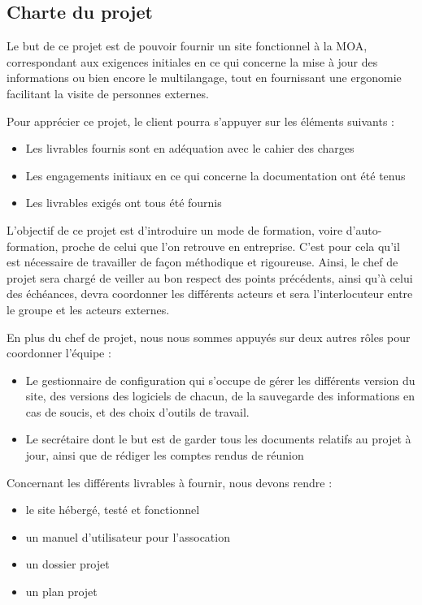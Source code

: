 \documentclass[11pt]{report}
\begin{document}
\subsection{Charte du projet}
Le but de ce projet est de pouvoir fournir un site fonctionnel à la MOA, 
correspondant aux exigences initiales en ce qui concerne la mise à jour des 
informations ou bien encore le multilangage, tout en fournissant une 
ergonomie facilitant la visite de personnes externes.\\

\par Pour apprécier ce projet, le client pourra s'appuyer sur les éléments 
suivants : 
\begin{itemize}
    \item Les livrables fournis sont en adéquation avec le cahier des charges
    \item Les engagements initiaux en ce qui concerne la documentation ont été 
tenus
    \item Les livrables exigés ont tous été fournis\\
\end{itemize}

\par L'objectif de ce projet est d'introduire un mode de formation, voire 
d'auto-formation, proche de celui que l'on retrouve en entreprise. C'est pour 
cela qu'il est nécessaire de travailler de façon méthodique et rigoureuse. 
Ainsi, le chef de projet sera chargé de veiller au bon respect des points 
précédents, ainsi qu'à celui des échéances, devra coordonner les différents 
acteurs et sera l'interlocuteur entre le groupe et les acteurs externes.\\

\par En plus du chef de projet, nous nous sommes appuyés sur deux autres rôles 
pour coordonner l'équipe : 
\begin{itemize}
    \item Le gestionnaire de configuration qui s'occupe de gérer les différents 
version du site, des versions des logiciels de chacun, de la sauvegarde des 
informations en cas de soucis, et des choix d'outils de travail.
    \item Le secrétaire dont le but est de garder tous les documents relatifs 
au projet à jour, ainsi que de rédiger les comptes rendus de réunion\\
\end{itemize}

\par Concernant les différents livrables à fournir, nous devons rendre : 
	\begin{itemize}
	  \item le site hébergé, testé et fonctionnel
	  \item un manuel d'utilisateur pour l'assocation
	  \item un dossier projet
	  \item un plan projet
	\end{itemize}
\end{document}
